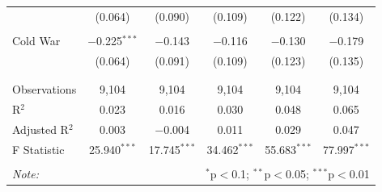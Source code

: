 \documentclass[
  12pt,
]{report}
\begin{document}
\begin{table}
{\begin{tabular}{@{\extracolsep{10pt}}lccccc}
  & (0.064) & (0.090) & (0.109) & (0.122) & (0.134) \\ 
  & & & & & \\ 
 Cold War & $-$0.225$^{***}$ & $-$0.143 & $-$0.116 & $-$0.130 & $-$0.179 \\ 
  & (0.064) & (0.091) & (0.109) & (0.123) & (0.135) \\ 
  & & & & & \\ 
\hline \\[-1.8ex] 
Observations & 9,104 & 9,104 & 9,104 & 9,104 & 9,104 \\ 
R$^{2}$ & 0.023 & 0.016 & 0.030 & 0.048 & 0.065 \\ 
Adjusted R$^{2}$ & 0.003 & $-$0.004 & 0.011 & 0.029 & 0.047 \\ 
F Statistic & 25.940$^{***}$ & 17.745$^{***}$ & 34.462$^{***}$ & 55.683$^{***}$ & 77.997$^{***}$ \\ 
\hline 
\hline \\[-1.8ex] 
\textit{Note:}  & \multicolumn{5}{r}{$^{*}$p$<$0.1; $^{**}$p$<$0.05; $^{***}$p$<$0.01} \\ 
\end{tabular}

}

\end{table}%
\end{document}
